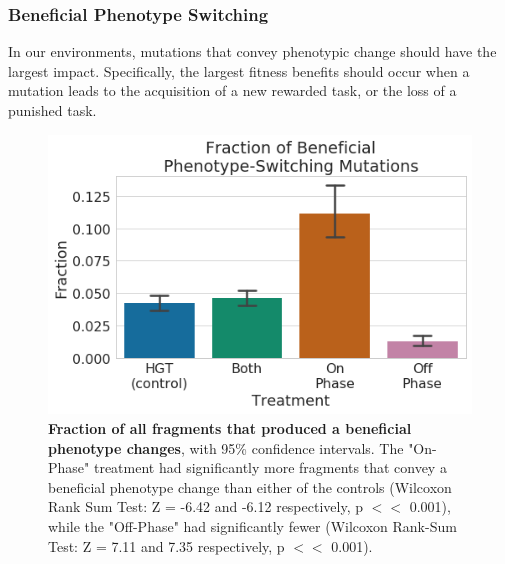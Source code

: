 \documentclass[PhD]{msu-thesis}
\begin{document}
\subsubsection{Beneficial Phenotype Switching}
In our environments, mutations that convey phenotypic change should have the largest impact. Specifically, the largest fitness benefits should occur when a mutation leads to the acquisition of a new rewarded task, or the loss of a punished task.  
	\begin{figure}[h!]
	\begin{center}
	\includegraphics[width=0.75\columnwidth]{figures/HGT/beneficial_fraction_by_cycle_phase_source.png}
	\caption{\textbf{Fraction of all fragments that produced a beneficial phenotype changes}, with 95\% confidence intervals. The "On-Phase" treatment had significantly more fragments that convey a beneficial phenotype change than either of the controls (Wilcoxon Rank Sum Test: Z = -6.42 and -6.12 respectively, p $<<$ 0.001), while the "Off-Phase" had significantly fewer (Wilcoxon Rank-Sum Test: Z = 7.11 and 7.35 respectively, p $<<$ 0.001).
	}\label{fig:beneficial_fraction_by_cycle_phase_source}
	\end{center}
	\end{figure}
\end{document}
